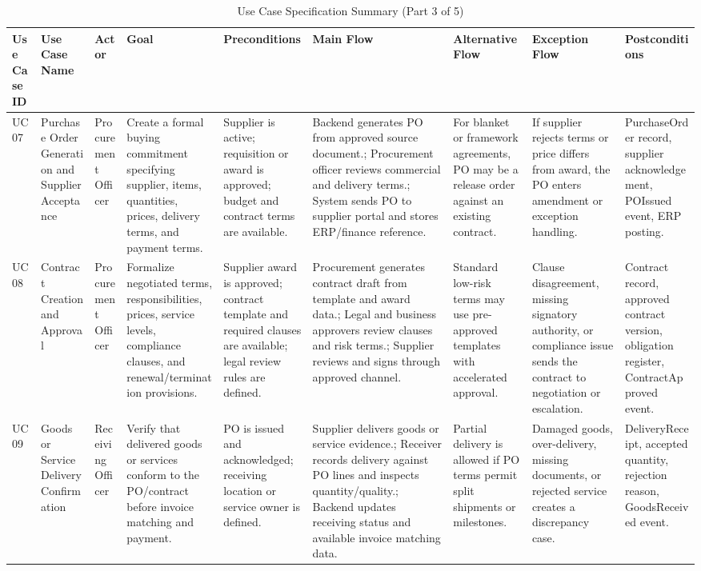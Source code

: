 \documentclass[conference]{IEEEtran}
\begin{document}
\begin{table}[!t]
\caption{Use Case Specification Summary (Part 3 of 5)}
\label{tab:usecases-3}
\tiny
\begin{tabularx}{\textwidth}{|L{0.75cm}|L{1.8cm}|L{1.6cm}|Y|Y|Y|Y|Y|Y|}
\hline
\textbf{Use Case ID} & \textbf{Use Case Name} & \textbf{Actor} & \textbf{Goal} & \textbf{Preconditions} & \textbf{Main Flow} & \textbf{Alternative Flow} & \textbf{Exception Flow} & \textbf{Postconditions} \\ \hline
UC07 & Purchase Order Generation and Supplier Acceptance & Procurement Officer & Create a formal buying commitment specifying supplier, items, quantities, prices, delivery terms, and payment terms. & Supplier is active; requisition or award is approved; budget and contract terms are available. & Backend generates PO from approved source document.; Procurement officer reviews commercial and delivery terms.; System sends PO to supplier portal and stores ERP/finance reference. & For blanket or framework agreements, PO may be a release order against an existing contract. & If supplier rejects terms or price differs from award, the PO enters amendment or exception handling. & PurchaseOrder record, supplier acknowledgement, POIssued event, ERP posting. \\ \hline
UC08 & Contract Creation and Approval & Procurement Officer & Formalize negotiated terms, responsibilities, prices, service levels, compliance clauses, and renewal/termination provisions. & Supplier award is approved; contract template and required clauses are available; legal review rules are defined. & Procurement generates contract draft from template and award data.; Legal and business approvers review clauses and risk terms.; Supplier reviews and signs through approved channel. & Standard low-risk terms may use pre-approved templates with accelerated approval. & Clause disagreement, missing signatory authority, or compliance issue sends the contract to negotiation or escalation. & Contract record, approved contract version, obligation register, ContractApproved event. \\ \hline
UC09 & Goods or Service Delivery Confirmation & Receiving Officer & Verify that delivered goods or services conform to the PO/contract before invoice matching and payment. & PO is issued and acknowledged; receiving location or service owner is defined. & Supplier delivers goods or service evidence.; Receiver records delivery against PO lines and inspects quantity/quality.; Backend updates receiving status and available invoice matching data. & Partial delivery is allowed if PO terms permit split shipments or milestones. & Damaged goods, over-delivery, missing documents, or rejected service creates a discrepancy case. & DeliveryReceipt, accepted quantity, rejection reason, GoodsReceived event. \\ \hline
\end{tabularx}
\end{table}
\end{document}
